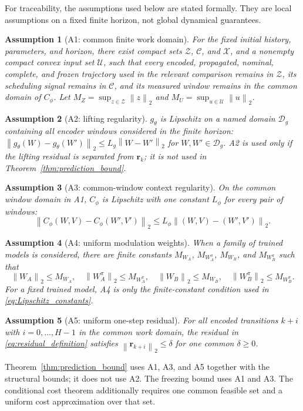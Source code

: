 ﻿\documentclass[journal]{IEEEtran}
\newtheorem{assumption}{Assumption}
\newcommand{\vr}{\mathbf{r}}
\newcommand{\norm}[1]{\left\lVert #1\right\rVert}
\begin{document}
For traceability, the assumptions used below are stated formally. They are local assumptions on a fixed finite horizon, not global dynamical guarantees.
\begin{assumption}[A1: common finite work domain]
\label{ass:a1}
For the fixed initial history, parameters, and horizon, there exist compact sets $\mathcal Z$, $\mathcal C$, and $\mathcal X$, and a nonempty compact convex input set $\mathcal U$, such that every encoded, propagated, nominal, complete, and frozen trajectory used in the relevant comparison remains in $\mathcal Z$, its scheduling signal remains in $\mathcal C$, and its measured window remains in the common domain of $C_\phi$. Let $M_Z=\sup_{z\in\mathcal Z}\norm{z}_2$ and $M_U=\sup_{u\in\mathcal U}\norm{u}_2$.
\end{assumption}
\begin{assumption}[A2: lifting regularity]
\label{ass:a2}
$g_\theta$ is Lipschitz on a named domain $\mathcal D_g$ containing all encoder windows considered in the finite horizon: $\norm{g_\theta(W)-g_\theta(W')}_2\le L_g\norm{W-W'}_2$ for $W,W'\in\mathcal D_g$. A2 is used only if the lifting residual is separated from $\vr_k$; it is not used in Theorem~\ref{thm:prediction_bound}.
\end{assumption}
\begin{assumption}[A3: common-window context regularity]
\label{ass:a3}
On the common window domain in A1, $C_\phi$ is Lipschitz with one constant $L_\phi$ for every pair of windows:
\begin{equation}
\norm{C_\phi(W,V)-C_\phi(W',V')}_2\le L_\phi\norm{(W,V)-(W',V')}_2.
\end{equation}
\end{assumption}
\begin{assumption}[A4: uniform modulation weights]
\label{ass:a4}
When a family of trained models is considered, there are finite constants $M_{W_A}$, $M_{W_A^\pi}$, $M_{W_B}$, and $M_{W_B^\pi}$ such that
\begin{equation}
\norm{W_A}_2\le M_{W_A},\quad \norm{W_A^\pi}_2\le M_{W_A^\pi},\quad
\norm{W_B}_2\le M_{W_B},\quad \norm{W_B^\pi}_2\le M_{W_B^\pi}.
\end{equation}
For a fixed trained model, A4 is only the finite-constant condition used in \eqref{eq:Lipschitz_constants}.
\end{assumption}
\begin{assumption}[A5: uniform one-step residual]
\label{ass:a5}
For all encoded transitions $k+i$ with $i=0,\ldots,H-1$ in the common work domain, the residual in \eqref{eq:residual_definition} satisfies $\norm{\vr_{k+i}}_2\le\delta$ for one common $\delta\ge0$.
\end{assumption}
Theorem~\ref{thm:prediction_bound} uses A1, A3, and A5 together with the structural bounds; it does not use A2. The freezing bound uses A1 and A3. The conditional cost theorem additionally requires one common feasible set and a uniform cost approximation over that set.
\end{document}
